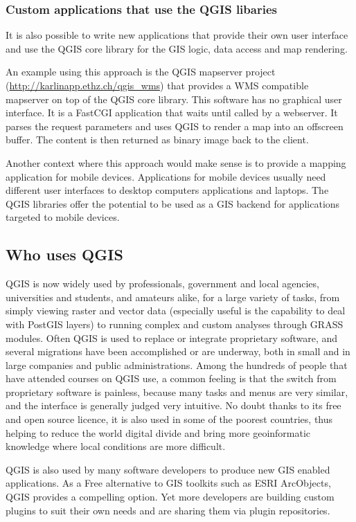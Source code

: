 \subsubsection{Custom applications that use the QGIS libaries}
It is also possible to write new applications that provide their own user
interface and use the QGIS core library for the GIS logic, data access and map
rendering. 

An example using this approach is the QGIS mapserver project
(\url{http://karlinapp.ethz.ch/qgis\_wms}) that provides a WMS
compatible mapserver on top of the QGIS core library. This software has no 
graphical user interface. It is a FastCGI application that waits until called
by a webserver. It parses the request parameters and uses QGIS to render a map
into an offscreen buffer. The content is then returned as binary image back to
the client.

Another context where this approach would make sense is to provide a mapping
application for mobile devices. Applications for mobile devices usually need
different user interfaces to desktop computers applications and
laptops. The QGIS libraries offer the potential to be used as a GIS backend for 
applications targeted to mobile devices.

\subsection{Who uses QGIS}
QGIS is now widely used by professionals, government and local agencies,
universities and students, and amateurs alike, for a large variety of tasks,
from simply viewing raster and vector data (especially useful is the capability
to deal with PostGIS layers) to running complex and custom analyses through
GRASS modules. Often QGIS is used to replace or integrate proprietary software, and
several migrations have been accomplished or are underway, both in small and in
large companies and public administrations. Among the hundreds of people that
have attended courses on QGIS use, a common feeling is that the switch from
proprietary software is painless, because many tasks and menus are very similar,
and the interface is generally judged very intuitive. No doubt thanks to its
free and open source licence, it is also used in some of the poorest countries,
thus helping to reduce the world digital divide and bring more geoinformatic
knowledge where local conditions are more difficult.

QGIS is also used by many software developers to produce new GIS enabled
applications. As a Free alternative to GIS toolkits such as ESRI ArcObjects,
QGIS provides a compelling option. Yet more developers are building custom
plugins to suit their own needs and are sharing them via plugin repositories. 

